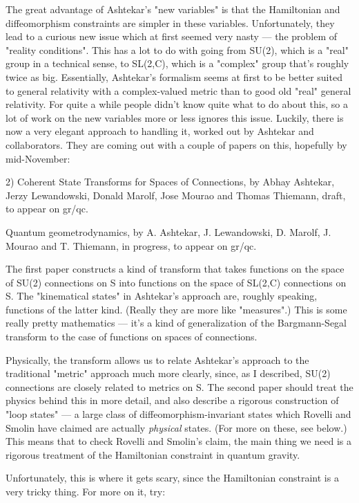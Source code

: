 The great advantage of Ashtekar's "new variables" is that the
Hamiltonian and diffeomorphism constraints are simpler in these
variables.  Unfortunately, they lead to a curious new issue which at
first seemed very nasty --- the problem of "reality conditions".  This
has a lot to do with going from SU(2), which is a "real" group in a
technical sense, to SL(2,C), which is a "complex" group that's roughly
twice as big.  Essentially, Ashtekar's formalism seems at first to be
better suited to general relativity with a complex-valued metric than
to good old "real" general relativity.  For quite a while people didn't
know quite what to do about this, so a lot of work on the new variables
more or less ignores this issue.  Luckily, there is now a very elegant
approach to handling it, worked out by Ashtekar and collaborators.  They
are coming out with a couple of papers on this, hopefully by
mid-November:

2) Coherent State Transforms for Spaces of Connections, by 
Abhay Ashtekar, Jerzy Lewandowski, Donald Marolf, Jose Mourao and
Thomas Thiemann, draft, to appear on gr/qc.

Quantum geometrodynamics, by A. Ashtekar, J. Lewandowski, D. Marolf, J.
Mourao and T. Thiemann, in progress, to appear on gr/qc.


The first paper constructs a kind of transform that takes functions on
the space of SU(2) connections on S into functions on the space of
SL(2,C) connections on S.  The "kinematical states" in Ashtekar's
approach are, roughly speaking, functions of the latter kind.  (Really
they are more like "measures".)  This is some really pretty mathematics
--- it's a kind of generalization of the Bargmann-Segal transform to the
case of functions on spaces of connections.

Physically, the transform allows us to relate Ashtekar's approach to the
traditional "metric" approach much more clearly, since, as I described,
SU(2) connections are closely related to metrics on S.  The second paper
should treat the physics behind this in more detail, and also describe a
rigorous construction of "loop states" --- a large class of
diffeomorphism-invariant states which Rovelli and Smolin have claimed
are actually \emph{physical} states.  (For more on these, see below.)  This
means that to check Rovelli and Smolin's claim, the main thing we need
is a rigorous treatment of the Hamiltonian constraint in quantum
gravity.

Unfortunately, this is where it gets scary, since the Hamiltonian
constraint is a very tricky thing.  For more on it, try:

